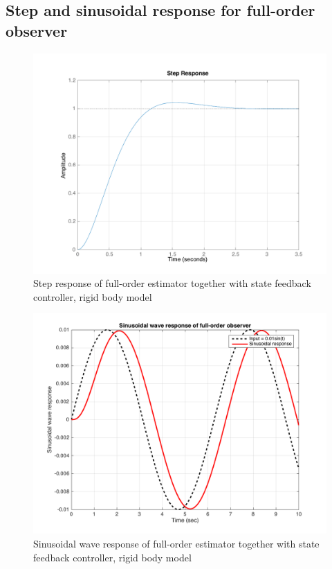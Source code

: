 \documentclass[a4paper, 12pt]{article}
\begin{document}
\subsection{Step and sinusoidal response for full-order observer}

\begin{figure}[!htbp]
\centering
\includegraphics[scale = 0.3]{StepResponseFullOrderEst}
\caption{Step response of full-order estimator together with state feedback controller, rigid body model}
\label{StepResponseFullOrderEst}
\end{figure}

\begin{figure}[!htbp]
\centering
\includegraphics[scale = 0.3]{SinusoidalResponseFullOrderEst}
\caption{Sinusoidal wave response of full-order estimator together with state feedback controller, rigid body model}
\label{SinusoidalResponseFullOrderEst}
\end{figure}
\end{document}
